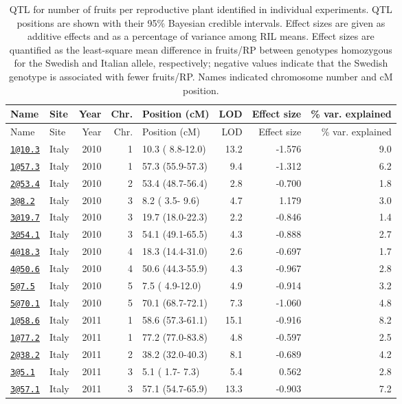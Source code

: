 \documentclass[]{article}
\begin{document}
\begin{longtable}[]{@{}llrrlrrr@{}}
\caption{\label{tab:individual-frut-qtl}QTL for number of fruits per reproductive plant identified in individual experiments. QTL positions are shown with their 95\% Bayesian credible intervals. Effect sizes are given as additive effects and as a percentage of variance among RIL means. Effect sizes are quantified as the least-square mean difference in fruits/RP between genotypes homozygous for the Swedish and Italian allele, respectively; negative values indicate that the Swedish genotype is associated with fewer fruits/RP. Names indicated chromosome number and cM position.}\tabularnewline
\toprule
Name & Site & Year & Chr. & Position (cM) & LOD & Effect size & \% var. explained\tabularnewline
\midrule
\endfirsthead
\toprule
Name & Site & Year & Chr. & Position (cM) & LOD & Effect size & \% var. explained\tabularnewline
\midrule
\endhead
\href{mailto:1@10.3}{\nolinkurl{1@10.3}} & Italy & 2010 & 1 & 10.3 ( 8.8-12.0) & 13.2 & -1.576 & 9.0\tabularnewline
\href{mailto:1@57.3}{\nolinkurl{1@57.3}} & Italy & 2010 & 1 & 57.3 (55.9-57.3) & 9.4 & -1.312 & 6.2\tabularnewline
\href{mailto:2@53.4}{\nolinkurl{2@53.4}} & Italy & 2010 & 2 & 53.4 (48.7-56.4) & 2.8 & -0.700 & 1.8\tabularnewline
\href{mailto:3@8.2}{\nolinkurl{3@8.2}} & Italy & 2010 & 3 & 8.2 ( 3.5- 9.6) & 4.7 & 1.179 & 3.0\tabularnewline
\href{mailto:3@19.7}{\nolinkurl{3@19.7}} & Italy & 2010 & 3 & 19.7 (18.0-22.3) & 2.2 & -0.846 & 1.4\tabularnewline
\href{mailto:3@54.1}{\nolinkurl{3@54.1}} & Italy & 2010 & 3 & 54.1 (49.1-65.5) & 4.3 & -0.888 & 2.7\tabularnewline
\href{mailto:4@18.3}{\nolinkurl{4@18.3}} & Italy & 2010 & 4 & 18.3 (14.4-31.0) & 2.6 & -0.697 & 1.7\tabularnewline
\href{mailto:4@50.6}{\nolinkurl{4@50.6}} & Italy & 2010 & 4 & 50.6 (44.3-55.9) & 4.3 & -0.967 & 2.8\tabularnewline
\href{mailto:5@7.5}{\nolinkurl{5@7.5}} & Italy & 2010 & 5 & 7.5 ( 4.9-12.0) & 4.9 & -0.914 & 3.2\tabularnewline
\href{mailto:5@70.1}{\nolinkurl{5@70.1}} & Italy & 2010 & 5 & 70.1 (68.7-72.1) & 7.3 & -1.060 & 4.8\tabularnewline
\href{mailto:1@58.6}{\nolinkurl{1@58.6}} & Italy & 2011 & 1 & 58.6 (57.3-61.1) & 15.1 & -0.916 & 8.2\tabularnewline
\href{mailto:1@77.2}{\nolinkurl{1@77.2}} & Italy & 2011 & 1 & 77.2 (77.0-83.8) & 4.8 & -0.597 & 2.5\tabularnewline
\href{mailto:2@38.2}{\nolinkurl{2@38.2}} & Italy & 2011 & 2 & 38.2 (32.0-40.3) & 8.1 & -0.689 & 4.2\tabularnewline
\href{mailto:3@5.1}{\nolinkurl{3@5.1}} & Italy & 2011 & 3 & 5.1 ( 1.7- 7.3) & 5.4 & 0.562 & 2.8\tabularnewline
\href{mailto:3@57.1}{\nolinkurl{3@57.1}} & Italy & 2011 & 3 & 57.1 (54.7-65.9) & 13.3 & -0.903 & 7.2\tabularnewline

\end{longtable}
\end{document}
